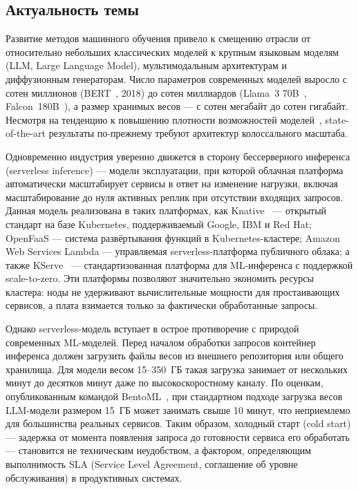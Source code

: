 
\subsection*{Актуальность темы}

Развитие методов машинного обучения привело к смещению отрасли от относительно небольших классических моделей к крупным языковым моделям (LLM, Large Language Model), мультимодальным архитектурам и диффузионным генераторам. Число параметров современных моделей выросло с сотен миллионов (BERT~\cite{bert2018}, 2018) до сотен миллиардов (Llama~3 70B~\cite{llamapaper2024}, Falcon~180B~\cite{falcon2023}), а размер хранимых весов --- с сотен мегабайт до сотен гигабайт. Несмотря на тенденцию к повышению плотности возможностей моделей~\cite{capability_density}, state-of-the-art результаты по-прежнему требуют архитектур колоссального масштаба.

Одновременно индустрия уверенно движется в сторону бессерверного инференса (serverless inference) --- модели эксплуатации, при которой облачная платформа автоматически масштабирует сервисы в ответ на изменение нагрузки, включая масштабирование до нуля активных реплик при отсутствии входящих запросов. Данная модель реализована в таких платформах, как Knative~\cite{knative} --- открытый стандарт на базе Kubernetes, поддерживаемый Google, IBM и Red Hat; OpenFaaS --- система развёртывания функций в Kubernetes-кластере; Amazon Web Services Lambda --- управляемая serverless-платформа публичного облака; а также KServe~\cite{kserve} --- стандартизованная платформа для ML-инференса с поддержкой scale-to-zero. Эти платформы позволяют значительно экономить ресурсы кластера: ноды не удерживают вычислительные мощности для простаивающих сервисов, а плата взимается только за фактически обработанные запросы.

Однако serverless-модель вступает в острое противоречие с природой современных ML-моделей. Перед началом обработки запросов контейнер инференса должен загрузить файлы весов из внешнего репозитория или общего хранилища. Для модели весом 15--350~ГБ такая загрузка занимает от нескольких минут до десятков минут даже по высокоскоростному каналу. По оценкам, опубликованным командой BentoML~\cite{bentoml2024cold}, при стандартном подходе загрузка весов LLM-модели размером 15~ГБ может занимать свыше 10 минут, что неприемлемо для большинства реальных сервисов. Таким образом, холодный старт (cold start) --- задержка от момента появления запроса до готовности сервиса его обработать --- становится не техническим неудобством, а фактором, определяющим выполнимость SLA (Service Level Agreement, соглашение об уровне обслуживания) в продуктивных системах.

